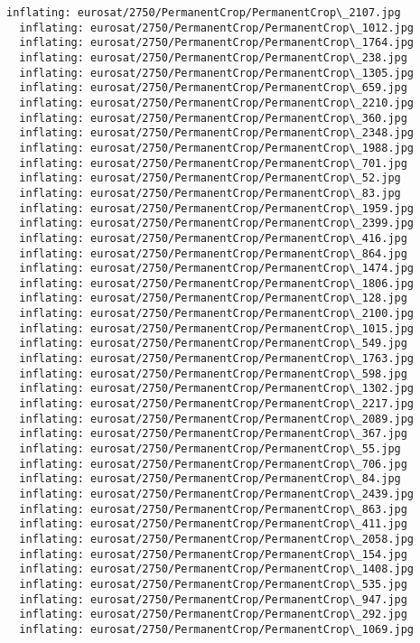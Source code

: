 \documentclass[11pt]{article}
\begin{document}
\begin{Verbatim}[commandchars=\\\{\}]
  inflating: eurosat/2750/PermanentCrop/PermanentCrop\_2107.jpg
  inflating: eurosat/2750/PermanentCrop/PermanentCrop\_1012.jpg
  inflating: eurosat/2750/PermanentCrop/PermanentCrop\_1764.jpg
  inflating: eurosat/2750/PermanentCrop/PermanentCrop\_238.jpg
  inflating: eurosat/2750/PermanentCrop/PermanentCrop\_1305.jpg
  inflating: eurosat/2750/PermanentCrop/PermanentCrop\_659.jpg
  inflating: eurosat/2750/PermanentCrop/PermanentCrop\_2210.jpg
  inflating: eurosat/2750/PermanentCrop/PermanentCrop\_360.jpg
  inflating: eurosat/2750/PermanentCrop/PermanentCrop\_2348.jpg
  inflating: eurosat/2750/PermanentCrop/PermanentCrop\_1988.jpg
  inflating: eurosat/2750/PermanentCrop/PermanentCrop\_701.jpg
  inflating: eurosat/2750/PermanentCrop/PermanentCrop\_52.jpg
  inflating: eurosat/2750/PermanentCrop/PermanentCrop\_83.jpg
  inflating: eurosat/2750/PermanentCrop/PermanentCrop\_1959.jpg
  inflating: eurosat/2750/PermanentCrop/PermanentCrop\_2399.jpg
  inflating: eurosat/2750/PermanentCrop/PermanentCrop\_416.jpg
  inflating: eurosat/2750/PermanentCrop/PermanentCrop\_864.jpg
  inflating: eurosat/2750/PermanentCrop/PermanentCrop\_1474.jpg
  inflating: eurosat/2750/PermanentCrop/PermanentCrop\_1806.jpg
  inflating: eurosat/2750/PermanentCrop/PermanentCrop\_128.jpg
  inflating: eurosat/2750/PermanentCrop/PermanentCrop\_2100.jpg
  inflating: eurosat/2750/PermanentCrop/PermanentCrop\_1015.jpg
  inflating: eurosat/2750/PermanentCrop/PermanentCrop\_549.jpg
  inflating: eurosat/2750/PermanentCrop/PermanentCrop\_1763.jpg
  inflating: eurosat/2750/PermanentCrop/PermanentCrop\_598.jpg
  inflating: eurosat/2750/PermanentCrop/PermanentCrop\_1302.jpg
  inflating: eurosat/2750/PermanentCrop/PermanentCrop\_2217.jpg
  inflating: eurosat/2750/PermanentCrop/PermanentCrop\_2089.jpg
  inflating: eurosat/2750/PermanentCrop/PermanentCrop\_367.jpg
  inflating: eurosat/2750/PermanentCrop/PermanentCrop\_55.jpg
  inflating: eurosat/2750/PermanentCrop/PermanentCrop\_706.jpg
  inflating: eurosat/2750/PermanentCrop/PermanentCrop\_84.jpg
  inflating: eurosat/2750/PermanentCrop/PermanentCrop\_2439.jpg
  inflating: eurosat/2750/PermanentCrop/PermanentCrop\_863.jpg
  inflating: eurosat/2750/PermanentCrop/PermanentCrop\_411.jpg
  inflating: eurosat/2750/PermanentCrop/PermanentCrop\_2058.jpg
  inflating: eurosat/2750/PermanentCrop/PermanentCrop\_154.jpg
  inflating: eurosat/2750/PermanentCrop/PermanentCrop\_1408.jpg
  inflating: eurosat/2750/PermanentCrop/PermanentCrop\_535.jpg
  inflating: eurosat/2750/PermanentCrop/PermanentCrop\_947.jpg
  inflating: eurosat/2750/PermanentCrop/PermanentCrop\_292.jpg
  inflating: eurosat/2750/PermanentCrop/PermanentCrop\_1069.jpg

\end{Verbatim}
\end{document}
